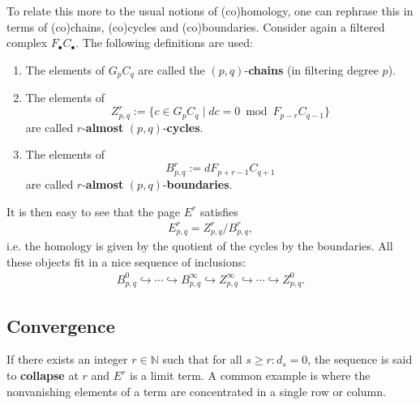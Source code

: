     To relate this more to the usual notions of (co)homology, one can rephrase this in terms of (co)chains, (co)cycles and (co)boundaries. Consider again a filtered complex $F_\bullet C_\bullet$. The following definitions are used:
    \begin{enumerate}
        \item The elements of $G_pC_q$ are called the $(p,q)$-\textbf{chains} (in filtering degree $p$).
        \item The elements of \[Z^r_{p,q} := \{c\in G_pC_q\mid dc=0\bmod F_{p-r}C_{q-1}\}\] are called $r$-\textbf{almost} $(p,q)$-\textbf{cycles}.
        \item The elements of \[B^r_{p,q} := dF_{p+r-1}C_{q+1}\] are called $r$-\textbf{almost} $(p,q)$-\textbf{boundaries}.
    \end{enumerate}
    It is then easy to see that the page $E^r$ satisfies
    \begin{gather}
        E^r_{p,q} = Z^r_{p,q}/B^r_{p,q},
    \end{gather}
    i.e. the homology is given by the quotient of the cycles by the boundaries. All these objects fit in a nice sequence of inclusions:
    \begin{gather}
        B^0_{p,q}\hookrightarrow\cdots\hookrightarrow B^\infty_{p,q}\hookrightarrow Z^\infty_{p,q}\hookrightarrow\cdots\hookrightarrow Z^0_{p,q}.
    \end{gather}

\subsection{Convergence}

    \begin{example}
        If there exists an integer $r\in\mathbb{N}$ such that for all $s\geq r:d_s=0$, the sequence is said to \textbf{collapse} at $r$ and $E^r$ is a limit term. A common example is where the nonvanishing elements of a term are concentrated in a single row or column.
    \end{example}

